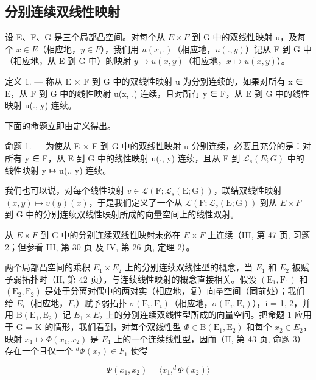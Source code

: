\subsection{分别连续双线性映射}

设 E、F、G 是三个局部凸空间。对每个从 \(E \times F\) 到 G 中的双线性映射 u，及每个 \(x \in E\)（相应地，\(y \in F\)），我们用 \(u(x, .)\)（相应地，\(u(., y)\)）记从 F 到 G 中（相应地，从 E 到 G 中）的映射 \(y \mapsto u(x, y)\)（相应地，\(x \mapsto u(x, y)\)）。

定义 1. --- 称从 E × F 到 G 中的双线性映射 u 为分别连续的，如果对所有 x ∈ E，从 F 到 G 中的线性映射 u(x, .) 连续，且对所有 y ∈ F，从 E 到 G 中的线性映射 u(., y) 连续。

下面的命题立即由定义得出。

命题 1. --- 为使从 E × F 到 G 中的双线性映射 u 分别连续，必要且充分的是：对所有 y ∈ F，从 E 到 G 中的线性映射 u(., y) 连续，且从 F 到 \(\mathcal{L}_s(E; G)\) 中的线性映射 y ↦ u(., y) 连续。

我们也可以说，对每个线性映射 \(v \in \mathcal{L}\left(\mathrm{F}; \mathcal{L}_{s}(\mathrm{E}; \mathrm{G})\right)\)，联结双线性映射 \((x, y) \mapsto v(y)(x)\)，于是我们定义了一个从 \(\mathcal{L}(\mathrm{F}; \mathcal{L}_{s}(\mathrm{E}; \mathrm{G}))\) 到从 \(E \times F\) 到 G 中的分别连续双线性映射所成的向量空间上的线性双射。

从 \(E \times F\) 到 G 中的分别连续双线性映射未必在 \(E \times F\) 上连续（III, 第 47 页, 习题 2；但参看 III, 第 30 页 及 IV, 第 26 页, 定理 2）。

两个局部凸空间的乘积 \(E_{1} \times E_{2}\) 上的分别连续双线性型的概念，当 \(E_{1}\) 和 \(E_{2}\) 被赋予弱拓扑时（II, 第 42 页），与连续线性映射的概念直接相关。假设 \((\mathrm{E}_{1}, \mathrm{F}_{1})\) 和 \((\mathrm{E}_{2}, \mathrm{F}_{2})\) 是处于分离对偶中的两对实（相应地，复）向量空间（同前处）；我们给 \(E_{i}\)（相应地，\(F_{i}\)）赋予弱拓扑 \(\sigma(\mathrm{E}_{i}, \mathrm{F}_{i})\)（相应地，\(\sigma(\mathrm{F}_{i}, \mathrm{E}_{i})\)），i = 1, 2，并用 \(\mathrm{B}(\mathrm{E}_{1}, \mathrm{E}_{2})\) 记 \(E_{1} \times E_{2}\) 上的分别连续双线性型所成的向量空间。把命题 1 应用于 G = K 的情形，我们看到，对每个双线性型 \(\Phi \in \mathrm{B}(\mathrm{E}_{1}, \mathrm{E}_{2})\) 和每个 \(x_{2} \in E_{2}\)，映射 \(x_{1} \mapsto \Phi(x_{1}, x_{2})\) 是 \(E_{1}\) 上的一个连续线性型，因而（II, 第 43 页, 命题 3）存在一个且仅一个 \(^{d}\Phi(x_{2}) \in F_{1}\) 使得

\[
\Phi (x _ {1}, x _ {2}) = \langle x _ {1}, ^ {d} \Phi (x _ {2}) \rangle\tag{1}
\]

